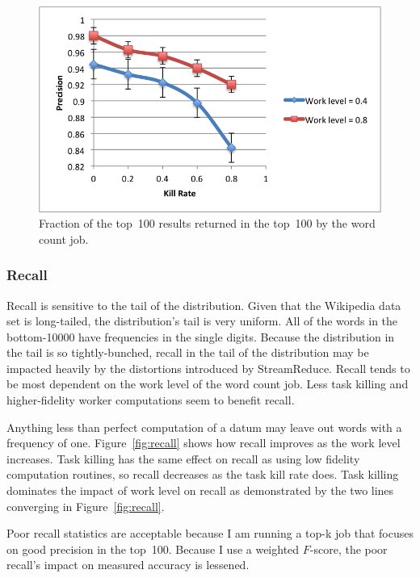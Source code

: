 \documentclass[12pt,twocolumn]{article}
\begin{document}
\begin{figure}
\includegraphics[width=\linewidth]{top-100-precision.png}
\caption{Fraction of the top~100 results returned in the top~100 by the word count job.}
\label{fig:precision}
\end{figure}

\subsubsection{Recall}
Recall is sensitive to the tail of the distribution. Given that the Wikipedia
data set is long-tailed, the distribution's tail is very uniform. All of the words
in the bottom-10000 have frequencies in the single digits. Because the distribution in the
tail is so tightly-bunched, recall in the tail of the distribution may be impacted heavily
by the distortions introduced by StreamReduce. Recall tends to be most dependent on the
work level of the word count job. Less task killing and higher-fidelity worker computations
seem to benefit recall.

Anything less than perfect computation of a datum may leave out words with a frequency of one.
Figure~\ref{fig:recall} shows how recall improves as the work level increases. Task killing has
the same effect on recall as using low fidelity computation routines, so recall decreases as
the task kill rate does. Task killing dominates the impact of work level on recall as
demonstrated by the two lines converging in Figure~\ref{fig:recall}.

Poor recall statistics are acceptable because I am running a top-k job that focuses
on good precision in the top~100. Because I use a weighted $F$-score, the poor recall's
impact on measured accuracy is lessened.
\end{document}
